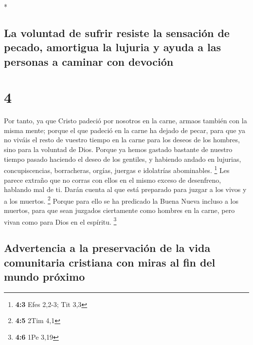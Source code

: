 \begin{paracol}{2}
\switchcolumn[0]*

\hypertarget{la-voluntad-de-sufrir-resiste-la-sensaciuxf3n-de-pecado-amortigua-la-lujuria-y-ayuda-a-las-personas-a-caminar-con-devociuxf3n}{%
\subsection{La voluntad de sufrir resiste la sensación de pecado,
amortigua la lujuria y ayuda a las personas a caminar con
devoción}\label{la-voluntad-de-sufrir-resiste-la-sensaciuxf3n-de-pecado-amortigua-la-lujuria-y-ayuda-a-las-personas-a-caminar-con-devociuxf3n}}

\hypertarget{section-6}{%
\section{4}\label{section-6}}

 Por tanto, ya que Cristo padeció por nosotros en la
carne, armaos también con la misma mente; porque el que padeció en la
carne ha dejado de pecar,  para que ya no viváis el resto
de vuestro tiempo en la carne para los deseos de los hombres, sino para
la voluntad de Dios.  Porque ya hemos gastado bastante de
nuestro tiempo pasado haciendo el deseo de los gentiles, y habiendo
andado en lujurias, concupiscencias, borracheras, orgías, juergas e
idolatrías abominables. \footnote{\textbf{4:3} Efes 2,2-3; Tit 3,3}
 Les parece extraño que no corras con ellos en el mismo
exceso de desenfreno, hablando mal de ti.  Darán cuenta al
que está preparado para juzgar a los vivos y a los muertos. \footnote{\textbf{4:5}
  2Tim 4,1}  Porque para ello se ha predicado la Buena
Nueva incluso a los muertos, para que sean juzgados ciertamente como
hombres en la carne, pero vivan como para Dios en el espíritu.
\footnote{\textbf{4:6} 1Pe 3,19}

\hypertarget{advertencia-a-la-preservaciuxf3n-de-la-vida-comunitaria-cristiana-con-miras-al-fin-del-mundo-pruxf3ximo}{%
\subsection{Advertencia a la preservación de la vida comunitaria
cristiana con miras al fin del mundo
próximo}\label{advertencia-a-la-preservaciuxf3n-de-la-vida-comunitaria-cristiana-con-miras-al-fin-del-mundo-pruxf3ximo}}


\end{paracol}
